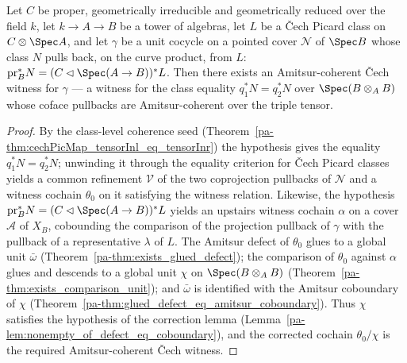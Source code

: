 \begin{theorem}
  \label{pa-thm:exists_coherentCechWitness}
  \leanok

  Let \(C\) be proper, geometrically irreducible and geometrically reduced over the field
  \(k\), let \(k \to A \to B\) be a tower of algebras, let \(L\) be a \v Cech Picard class on
  \(C \otimes \Spec A\), and let \(\gamma\) be a unit cocycle on a pointed cover \(\mathcal N\)
  of \(\Spec B\) whose class \(N\) pulls back, on the curve product, from \(L\):
  \(\mathrm{pr}_B^{*} N = (C \lhd \Spec(A \to B))^{*} L\). Then there exists an Amitsur-coherent
  \v Cech witness for \(\gamma\) — a witness for the class equality
  \(q_1^{*} N = q_2^{*} N\) over \(\Spec(B \otimes_A B)\) whose coface pullbacks are Amitsur-coherent
  over the triple tensor.
\end{theorem}
\begin{proof}
  \leanok
  By the class-level coherence seed (Theorem~\ref{pa-thm:cechPicMap_tensorInl_eq_tensorInr}) the
  hypothesis gives the equality \(q_1^{*} N = q_2^{*} N\); unwinding it through the
  equality criterion for \v Cech Picard classes yields a common refinement \(\mathcal V\) of the
  two coprojection pullbacks of \(\mathcal N\) and a witness cochain \(\theta_0\) on it
  satisfying the witness relation. Likewise, the hypothesis
  \(\mathrm{pr}_B^{*} N = (C \lhd \Spec(A \to B))^{*} L\) yields an upstairs witness cochain
  \(\alpha\) on a cover \(\mathcal A\) of \(X_B\), cobounding the comparison of the projection
  pullback of \(\gamma\) with the pullback of a representative \(\lambda\) of \(L\).
  The Amitsur defect of \(\theta_0\) glues to a global unit \(\bar\omega\)
  (Theorem~\ref{pa-thm:exists_glued_defect}); the comparison of \(\theta_0\) against
  \(\alpha\) glues and descends to a global unit \(\chi\) on \(\Spec(B \otimes_A B)\)
  (Theorem~\ref{pa-thm:exists_comparison_unit}); and \(\bar\omega\) is identified
  with the Amitsur coboundary of \(\chi\) (Theorem~\ref{pa-thm:glued_defect_eq_amitsur_coboundary}).
  Thus \(\chi\) satisfies the hypothesis of the correction lemma
  (Lemma~\ref{pa-lem:nonempty_of_defect_eq_coboundary}), and the corrected cochain
  \(\theta_0/\chi\) is the required Amitsur-coherent \v Cech witness.
\end{proof}

